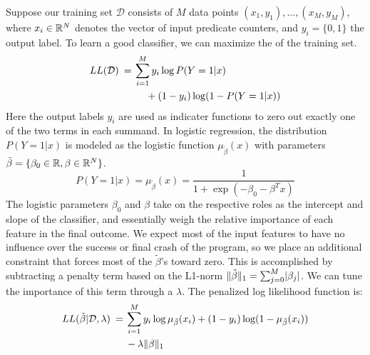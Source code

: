 Suppose our training set $\mathcal{D}$ consists of $M$ data points
$(x_1,y_1), \ldots, (x_M, y_M) $, where $x_i \in \mathbb{R}^N$ denotes the vector of
input predicate counters, and $y_i = \{0, 1\}$ the output label.  To
learn a good classifier, we can maximize the 
of the training set.
\begin{equation*}
  \begin{split}
    LL( \mathcal{D} ) \:=\:
    & \sum_{i=1}^M y_i \log P(Y = 1 | x) \\
    & \hskip12pt + (1 - y_i) \log (1 - P(Y = 1 | x))
  \end{split}
\end{equation*}
Here the output labels $y_i$ are used as indicater functions to zero
out exactly one of the two terms in each summand.  In logistic
regression, the distribution $P(Y=1|x)$ is modeled as the logistic
function $\mu_{\tilde\beta}(x)$ with parameters $\tilde\beta = \{ \beta_0 \in \mathbb{R}, \beta
\in \mathbb{R}^N \}$.
\begin{equation*}
  P(Y = 1 | x) = \mu_{\tilde \beta} (x) = \frac{1}{ 1 + \exp(- \beta_0 - \beta^T x) }
\end{equation*}
The logistic parameters $\beta_0$ and $\beta$ take on the respective roles
as the intercept and slope of the classifier, and essentially weigh
the relative importance of each feature in the final outcome.  We
expect most of the input features to have no influence over the
success or final crash of the program, so we place an additional
constraint that forces most of the $\tilde \beta$'s toward zero.  This is
accomplished by subtracting a penalty term based on the L1-norm
$\lVert\tilde \beta \rVert_1 = \sum_{j=0}^M \lvert\beta_j\rvert$.  We can tune the
importance of this  term through a
 $\lambda$.  The penalized log likelihood
function is:
\begin{equation*}
  \begin{split}
    LL (\tilde\beta | \mathcal{D}, \lambda ) \:=\:
    & \sum_{i=1}^M y_i \log \mu_{ \tilde \beta } (x_i) + (1 - y_i) \log (1 - \mu_{ \tilde \beta } (x_i)) \\
    & - \lambda \lVert\beta\rVert_1
  \end{split}
\end{equation*}

